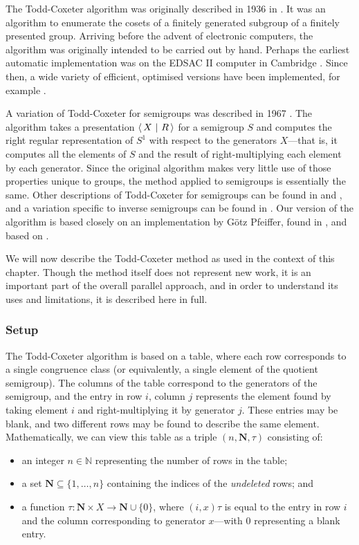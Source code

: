 The Todd-Coxeter algorithm was originally described in 1936 in
\cite{todd_coxeter_1936}.  It was an algorithm to enumerate the cosets of a
finitely generated subgroup of a finitely presented group.  Arriving before the
advent of electronic computers, the algorithm was originally intended to be
carried out by hand.  Perhaps the earliest automatic implementation was on the
EDSAC II computer in Cambridge \cite{leech_1963}.  Since then, a wide variety of
efficient, optimised versions have been implemented, for example \cite{ace}.

A variation of Todd-Coxeter for semigroups was described in 1967
\cite{neumann_1967}.  The algorithm takes a presentation $\left\langle\,X ~\middle|~ R\,\right\rangle$
for a semigroup $S$ and computes the right regular representation of $S^1$ with
respect to the generators $X$---that is, it computes all the elements of $S$ and
the result of right-multiplying each element by each generator.  Since the
original algorithm makes very little use of those properties unique to groups,
the method applied to semigroups is essentially the same.  Other descriptions of
Todd-Coxeter for semigroups can be found in \cite[Chapter 12]{ruskuc_thesis} and
\cite[Chapter 1.2]{walker_thesis}, and a variation specific to inverse
semigroups can be found in \cite{cutting_thesis}.  Our version of the algorithm
is based closely on an implementation by G\"otz Pfeiffer, found in
\cite[\texttt{lib/tcsemi.gi}]{gap}, and based on \cite{walker_thesis}.

We will now describe the Todd-Coxeter method as used in the context of this
chapter.  Though the method itself does not represent new work, it is an
important part of the overall parallel approach, and in order to understand its
uses and limitations, it is described here in full.

\subsubsection{Setup}

The Todd-Coxeter algorithm is based on a table, where each row corresponds to a
single congruence class (or equivalently, a single element of the quotient
semigroup).  The columns of the table correspond to the generators of the
semigroup, and the entry in row $i$, column $j$ represents the element found by
taking element $i$ and right-multiplying it by generator $j$.  These entries may
be blank, and two different rows may be found to describe the same element.
Mathematically, we can view this table as a triple $(n, \mathbf{N}, \tau)$
consisting of:
\begin{itemize}
\item an integer $n \in \mathbb{N}$ representing the number of rows in the table;
\item a set $\mathbf{N} \subseteq \{1, \ldots, n\}$ containing the indices of the
  \textit{undeleted} rows; and
\item a function $\tau: \mathbf{N} \times X \to \mathbf{N} \cup \{0\}$, where
  $(i, x)\tau$ is equal to the entry in row $i$ and the column corresponding to
  generator $x$---with $0$ representing a blank entry.
\end{itemize}


